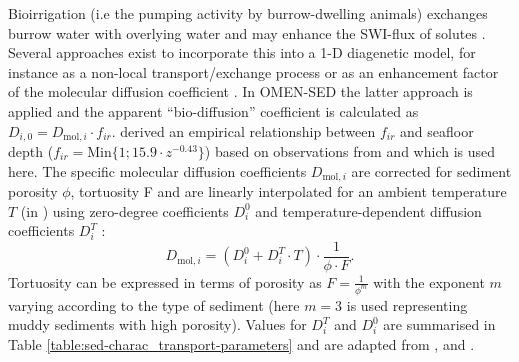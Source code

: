 \documentclass[gmd, manuscript]{copernicus}
\begin{document}
Bioirrigation (i.e the pumping activity by burrow-dwelling animals) exchanges burrow water with overlying water and may enhance the SWI-flux of solutes \citep{aller_importance_1984, aller1988benthic}. 
Several approaches exist to incorporate this into a 1-D diagenetic model, for instance as a non-local transport/exchange process \citep{boudreau_equivalence_1984, emerson_sediment-water_1984} 
or as an enhancement factor of the molecular diffusion coefficient \citep{devol_benthic_1993, soetaert_model_1996}. In OMEN-SED the latter approach is applied and the 
apparent ``bio-diffusion'' coefficient is calculated as $D_{i,0}=D_{\mathrm{mol},i}\cdot f_{ir}$. 
\citet{soetaert_model_1996} derived an empirical relationship between $f_{ir}$ and seafloor depth ($f_{ir} = \mathrm{Min}\{1; 15.9\cdot z^{-0.43}\}$) 
based on observations from \citet{archer_benthic_1992} and \citet{devol_benthic_1993} which is used here. 
The specific molecular diffusion coefficients $D_{\mathrm{mol},i}$ are corrected for sediment porosity $\phi$, tortuosity F and are linearly interpolated for an ambient 
temperature $T$ (in \textcelsius) using zero-degree coefficients $D^0_i$ and temperature-dependent diffusion coefficients $D^T_i$ \citep[][]{soetaert_model_1996}:
\begin{equation*}
 D_{\mathrm{mol},i} = (D^0_i + D^T_i \cdot T )\cdot \frac{1}{\phi\cdot F}.
\end{equation*}
Tortuosity can be expressed in terms of porosity as $F = \frac{1}{\phi^m}$ \citep{ullman_diffusion_1982} with the exponent $m$ varying according to the type of sediment (here $m=3$ is used representing muddy sediments with high porosity). 
Values for $D^T_i$ and $D^0_i$ are summarised in Table \ref{table:sed-charac_transport-parameters} and are adapted from \citet{Li_diffusion_1974}, \citet{schulz_quantification_2006} and \citet{gypens_simple_2008}.
\end{document}
